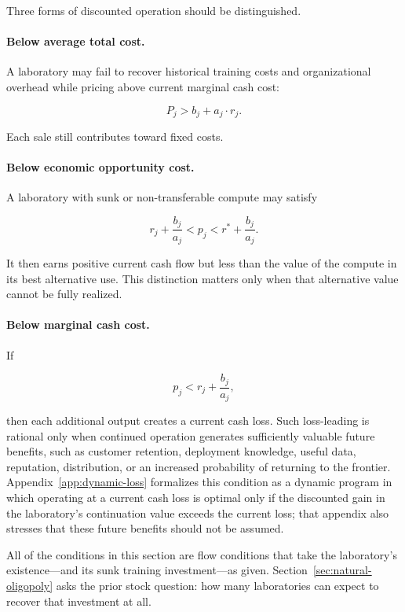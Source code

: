 \documentclass[11pt]{article}
\begin{document}
Three forms of discounted operation should be distinguished.

\paragraph{Below average total cost.} A laboratory may fail to recover historical training costs and organizational overhead while pricing above current marginal cash cost:

\begin{equation}P_j>b_j+a_j\cdot r_j.\end{equation}

Each sale still contributes toward fixed costs.

\paragraph{Below economic opportunity cost.} A laboratory with sunk or non-transferable compute may satisfy

\begin{equation}r_j+\frac{b_j}{a_j}<p_j<r^*+\frac{b_j}{a_j}.\end{equation}

It then earns positive current cash flow but less than the value of the compute in its best alternative use. This distinction matters only when that alternative value cannot be fully realized.

\paragraph{Below marginal cash cost.} If

\begin{equation}p_j<r_j+\frac{b_j}{a_j},\end{equation}

then each additional output creates a current cash loss. Such loss-leading is rational only when continued operation generates sufficiently valuable future benefits, such as customer retention, deployment knowledge, useful data, reputation, distribution, or an increased probability of returning to the frontier. Appendix~\ref{app:dynamic-loss} formalizes this condition as a dynamic program in which operating at a current cash loss is optimal only if the discounted gain in the laboratory's continuation value exceeds the current loss; that appendix also stresses that these future benefits should not be assumed.

All of the conditions in this section are flow conditions that take the laboratory's existence---and its sunk training investment---as given. Section~\ref{sec:natural-oligopoly} asks the prior stock question: how many laboratories can expect to recover that investment at all.
\end{document}
